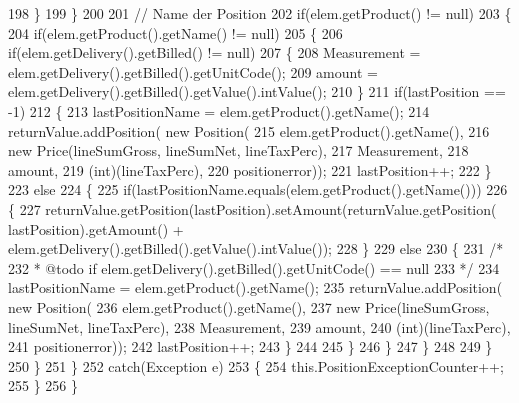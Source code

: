 \begin{DoxyCode}
198                     \}
199                 \}
200                 
201                 \textcolor{comment}{// Name der Position}
202                 \textcolor{keywordflow}{if}(elem.getProduct() != null)
203                 \{
204                     \textcolor{keywordflow}{if}(elem.getProduct().getName() != null)
205                     \{
206                         \textcolor{keywordflow}{if}(elem.getDelivery().getBilled() != null)
207                         \{
208                             Measurement = elem.getDelivery().getBilled().getUnitCode();
209                             amount = elem.getDelivery().getBilled().getValue().intValue();
210                         \}
211                         \textcolor{keywordflow}{if}(lastPosition == -1)
212                         \{
213                             lastPositionName = elem.getProduct().getName();
214                             returnValue.addPosition( \textcolor{keyword}{new} Position(
215                                     elem.getProduct().getName(),
216                                     \textcolor{keyword}{new} Price(lineSumGross, lineSumNet, lineTaxPerc),
217                                     Measurement,
218                                     amount,
219                                     (int)(lineTaxPerc),
220                                     positionerror));
221                             lastPosition++;
222                         \}
223                         \textcolor{keywordflow}{else}
224                         \{
225                             \textcolor{keywordflow}{if}(lastPositionName.equals(elem.getProduct().getName()))
226                             \{
227                                 returnValue.getPosition(lastPosition).setAmount(returnValue.getPosition(
      lastPosition).getAmount() + elem.getDelivery().getBilled().getValue().intValue());
228                             \}
229                             \textcolor{keywordflow}{else}
230                             \{
231                                 \textcolor{comment}{/* }
232 \textcolor{comment}{                                 * @todo if elem.getDelivery().getBilled().getUnitCode() == null}
233 \textcolor{comment}{                                 */}
234                                 lastPositionName = elem.getProduct().getName();
235                                 returnValue.addPosition( \textcolor{keyword}{new} Position(
236                                         elem.getProduct().getName(),
237                                         \textcolor{keyword}{new} Price(lineSumGross, lineSumNet, lineTaxPerc),
238                                         Measurement,
239                                         amount,
240                                         (int)(lineTaxPerc),
241                                         positionerror));
242                                 lastPosition++;     
243                             \}
244 
245                         \}
246                     \}
247                 \}
248                 
249             \}
250         \}
251         \}
252         \textcolor{keywordflow}{catch}(Exception e)
253         \{
254             this.PositionExceptionCounter++;
255         \}
256     \}
\end{DoxyCode}
